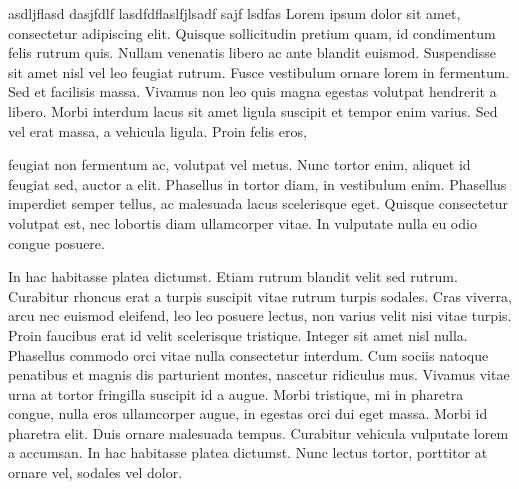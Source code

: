 





\startrule 
asdljflasd dasjfdlf lasdfdflaslfjlsadf sajf lsdfas Lorem ipsum dolor
sit amet, consectetur adipiscing elit. Quisque sollicitudin pretium
quam, id condimentum felis rutrum quis. Nullam venenatis libero ac
ante blandit euismod. Suspendisse sit amet nisl vel leo feugiat
rutrum. Fusce vestibulum ornare lorem in fermentum. Sed et facilisis
massa. Vivamus non leo quis magna egestas volutpat hendrerit a
libero. Morbi interdum lacus sit amet ligula suscipit et tempor enim
varius. Sed vel erat massa, a vehicula ligula. Proin felis eros,

feugiat non fermentum ac, volutpat vel metus. Nunc tortor enim,
aliquet id feugiat sed, auctor a elit. Phasellus in tortor diam, in
vestibulum enim. Phasellus imperdiet semper tellus, ac malesuada lacus
scelerisque eget. Quisque consectetur volutpat est, nec lobortis diam
ullamcorper vitae. In vulputate nulla eu odio congue posuere.

In hac habitasse platea dictumst. Etiam rutrum blandit velit sed
rutrum. Curabitur rhoncus erat a turpis suscipit vitae rutrum turpis
sodales. Cras viverra, arcu nec euismod eleifend, leo leo posuere
lectus, non varius velit nisi vitae turpis. Proin faucibus erat id
velit scelerisque tristique. Integer sit amet nisl nulla. Phasellus
commodo orci vitae nulla consectetur interdum. Cum sociis natoque
penatibus et magnis dis parturient montes, nascetur ridiculus
mus. Vivamus vitae urna at tortor fringilla suscipit id a augue. Morbi
tristique, mi in pharetra congue, nulla eros ullamcorper augue, in
egestas orci dui eget massa. Morbi id pharetra elit. Duis ornare
malesuada tempus. Curabitur vehicula vulputate lorem a accumsan. In
hac habitasse platea dictumst. Nunc lectus tortor, porttitor at ornare
vel, sodales vel dolor.
\endrule


{}

